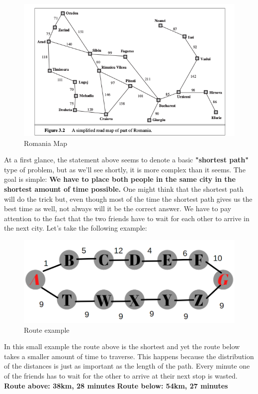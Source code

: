 \documentclass[12pt]{article}
\begin{document}
\begin{figure}[htp]
    \centering
    \includegraphics[width=1\textwidth]{Romania.png}
    \caption{Romania Map}
    \label{fig:Romania}
\end{figure}
\newpage
At a first glance, the statement above seems to denote a basic \textbf{"shortest path"} type of problem, but as we'll see shortly, it is more complex than it seems.
\newline
\newline
The goal is simple: \textbf{We have to place both people in the same city in the shortest amount of time possible.} One might think that the shortest path will do the trick but, even though most of the time the shortest path gives us the best time as well, not always will it be the correct answer. We have to pay attention to the fact that the two friends have to wait for each other to arrive in the next city. 
\newline
\newline
Let's take the following example:
\newline
\begin{figure}[htp]
    \centering
    \includegraphics[width=1\textwidth]{route_example.png}
    \caption{Route example}
    \label{fig:Route}
\end{figure}
\newline
In this small example the route above is the shortest and yet the route below takes a smaller amount of time to traverse. This happens because the distribution of the distances is just as important as the length of the path.
Every minute one of the friends has to wait for the other to arrive at their next stop is wasted.
\newline
\textbf{Route above: 38km, 28 minutes}
\newline
\textbf{Route below: 54km, 27 minutes}
\end{document}
